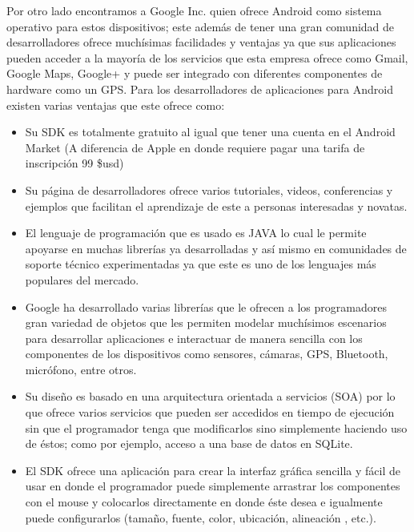 \documentclass[letterpaper,12pt]{book}
\begin{document}
\begin{mainmatter}
Por otro  lado encontramos  a Google Inc.   quien ofrece  Android como
sistema operativo  para estos dispositivos;  este además de  tener una
gran  comunidad  de desarrolladores  ofrece  muchísimas facilidades  y
ventajas ya  que sus aplicaciones pueden  acceder a la  mayoría de los
servicios que esta  empresa ofrece como Gmail, Google  Maps, Google+ y
puede  ser integrado con  diferentes componentes  de hardware  como un
GPS.  Para los  desarrolladores de  aplicaciones para  Android existen
varias ventajas que este ofrece como:

\begin{itemize}
\item Su SDK  es totalmente gratuito  al igual que  tener una cuenta  en el
Android  Market (A  diferencia de  Apple en  donde requiere  pagar una
tarifa de inscripción 99 \$usd)

\item Su  página  de  desarrolladores  ofrece  varios  tutoriales,  videos,
conferencias  y  ejemplos  que  facilitan  el aprendizaje  de  este  a
personas interesadas y novatas.

\item El lenguaje de  programación que es usado es JAVA  lo cual le permite
apoyarse  en  muchas  librerías   ya  desarrolladas  y  así  mismo  en
comunidades de  soporte técnico experimentadas  ya que este es  uno de
los lenguajes más populares del mercado.

\item Google  ha  desarrollado  varias  librerías  que  le  ofrecen  a  los
programadores  gran  variedad  de  objetos que  les  permiten  modelar
muchísimos escenarios  para desarrollar aplicaciones  e interactuar de
manera sencilla con los componentes de los dispositivos como sensores,
cámaras, GPS, Bluetooth, micrófono, entre otros.

\item Su diseño es  basado en una arquitectura orientada  a servicios (SOA)
por lo que ofrece varios  servicios que pueden ser accedidos en tiempo
de  ejecución  sin que  el  programador  tenga  que modificarlos  sino
simplemente haciendo uso de éstos; como por ejemplo, acceso a una base
de datos en SQLite.

\item El SDK ofrece una aplicación  para crear la interfaz gráfica sencilla
y fácil  de usar en  donde el programador puede  simplemente arrastrar
los componentes con  el mouse y colocarlos directamente  en donde éste
desea  e  igualmente   puede  configurarlos  (tamaño,  fuente,  color,
ubicación, alineación , etc.).


\end{itemize}
\end{mainmatter}
\end{document}
